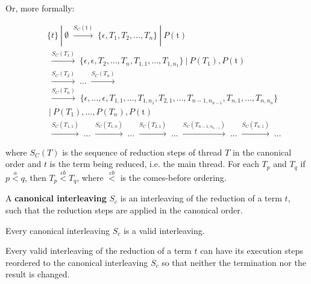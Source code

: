 \documentclass[runningheads,a4paper]{llncs}
\newcommand{\set}[1]{\{#1\}}
\begin{document}
\begin{definition}
Or, more formally:

\begin{eqnarray*}
& &\set{t}~|~\emptyset 
\;\stackrel{S_C(\text{t})}{\longrightarrow}\;
\set{\epsilon, T_1, T_2, \ldots, T_n}~|~P(\text{t}) \\
& &\;\stackrel{S_C(T_1)}{\longrightarrow}\;
\set{\epsilon, \epsilon, T_2, \ldots, T_n, T_{1,1}, \ldots,
  T_{1,n_1}}~|~P(T_1),P(\text{t}) \\
& &\;\stackrel{S_C(T_2)}{\longrightarrow}\;
\ldots \;\stackrel{S_C(T_n)}{\longrightarrow}\;\\
& &\;\stackrel{S_C(T_n)}{\longrightarrow}\;
\set{\epsilon, \ldots, \epsilon, T_{1,1}, \ldots,
  T_{1,n_1}, T_{2,1}, \ldots, T_{n-1,n_{n-1}}, T_{n,1}, \ldots,
  T_{n,n_n}}\\
& &~|~P(T_1),\ldots,P(T_n),P(\text{t}) \\
& &\;\stackrel{S_C(T_{1,1})}{\longrightarrow}\; \ldots
\;\stackrel{S_C(T_{1,n})}{\longrightarrow}\; \ldots
\;\stackrel{S_C(T_{2,1})}{\longrightarrow}\; \ldots
\;\stackrel{S_C(T_{n-1,n_{n-1}})}{\longrightarrow}\; \ldots
\;\stackrel{S_C(T_{n,1})}{\longrightarrow}\; \ldots
\end{eqnarray*}

where $S_C(T)$ is the sequence of reduction steps of thread $T$ in the
canonical order and $t$ is the term being reduced, i.e. the main
thread. For each $T_p$ and $T_q$ if $p \stackrel{a}{<} q$, then $T_p
\stackrel{cb}{<} T_q$, where $\stackrel{cb}{<}$ is the comes-before
ordering.

A \textbf{canonical interleaving} $S_c$ is an interleaving of the
reduction of a term $t$, such that the reduction steps are applied in
the canonical order.
\end{definition}

\begin{proposition}
Every canonical interleaving $S_c$ is a valid interleaving.
\end{proposition}

\begin{lemma}[Canonicity]\label{lemma-canonical-interleaving}
Every valid interleaving of the reduction of a term $t$ can have its
execution steps reordered to the canonical interleaving $S_c$ so that
neither the termination nor the result is changed.
\end{lemma}
\end{document}
